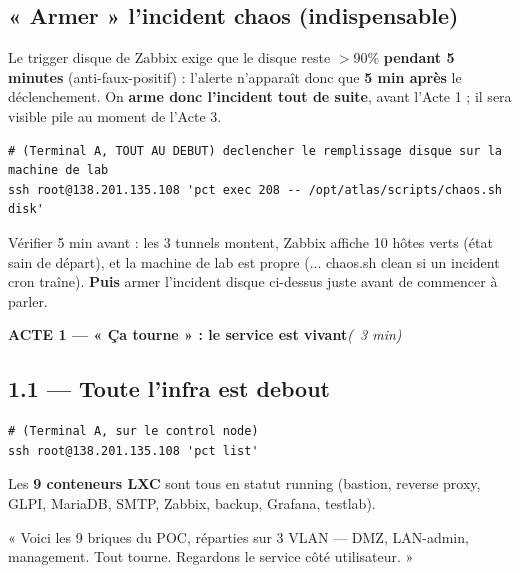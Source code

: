 \documentclass[11pt,a4paper]{article}
\newcommand{\acte}[2]{%
  \begin{tcolorbox}[enhanced,colback=atlasdark,colframe=atlasdark,coltext=white,
    sharp corners,boxrule=0pt,left=3mm,right=3mm,top=2mm,bottom=2mm,
    before skip=10pt,after skip=6pt]%
    {\bfseries\large #1}\dur{#2}%
  \end{tcolorbox}}
\newcommand{\cmd}[1]{{\ttfamily #1}}
\newcommand{\dur}[1]{\hfill{\small\color{codecom}\itshape (#1)}}
\begin{document}
\subsection*{« Armer » l'incident chaos (indispensable)}
Le trigger disque de Zabbix exige que le disque reste $>$90\% \textbf{pendant 5 minutes}
(anti-faux-positif) : l'alerte n'apparaît donc que \textbf{5 min après} le déclenchement.
On \textbf{arme donc l'incident tout de suite}, avant l'Acte 1 ; il sera visible pile au
moment de l'Acte 3.

\begin{lstlisting}[style=bash]
# (Terminal A, TOUT AU DEBUT) declencher le remplissage disque sur la machine de lab
ssh root@138.201.135.108 'pct exec 208 -- /opt/atlas/scripts/chaos.sh disk'
\end{lstlisting}

\begin{attention}
Vérifier 5 min avant : les 3 tunnels montent, Zabbix affiche 10 hôtes verts (état sain de
départ), et la machine de lab est propre (\cmd{... chaos.sh clean} si un incident cron
traîne). \textbf{Puis} armer l'incident disque ci-dessus juste avant de commencer à parler.
\end{attention}

\acte{ACTE 1 — « Ça tourne » : le service est vivant}{~3 min}

\subsection*{1.1 — Toute l'infra est debout}
\begin{lstlisting}[style=bash]
# (Terminal A, sur le control node)
ssh root@138.201.135.108 'pct list'
\end{lstlisting}
\begin{montrer}
Les \textbf{9 conteneurs LXC} sont tous en statut \cmd{running} (bastion, reverse proxy,
GLPI, MariaDB, SMTP, Zabbix, backup, Grafana, testlab).
\end{montrer}
\begin{dire}
« Voici les 9 briques du POC, réparties sur 3 VLAN — DMZ, LAN-admin, management. Tout
tourne. Regardons le service côté utilisateur. »
\end{dire}
\end{document}
